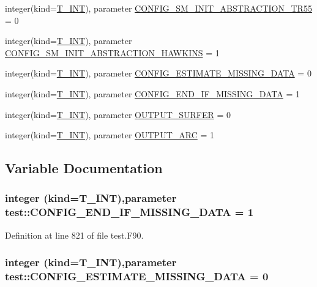 \begin{DoxyCompactItemize}
\item 
integer(kind=\hyperlink{namespacetest_a6f91ebd89b58cfcc5da99faed9385c1e}{T\_\-INT}), parameter \hyperlink{namespacetest_a8021cee63a2d97e255d88e15f412eb56}{CONFIG\_\-SM\_\-INIT\_\-ABSTRACTION\_\-TR55} = 0
\item 
integer(kind=\hyperlink{namespacetest_a6f91ebd89b58cfcc5da99faed9385c1e}{T\_\-INT}), parameter \hyperlink{namespacetest_ad42c9ade45d8d8085a2fd417fe22878a}{CONFIG\_\-SM\_\-INIT\_\-ABSTRACTION\_\-HAWKINS} = 1
\item 
integer(kind=\hyperlink{namespacetest_a6f91ebd89b58cfcc5da99faed9385c1e}{T\_\-INT}), parameter \hyperlink{namespacetest_a9cfe4d8cc45e7a6425b6484a7907ffbd}{CONFIG\_\-ESTIMATE\_\-MISSING\_\-DATA} = 0
\item 
integer(kind=\hyperlink{namespacetest_a6f91ebd89b58cfcc5da99faed9385c1e}{T\_\-INT}), parameter \hyperlink{namespacetest_a06fa73fa08fb7cb44b868aead4d77a73}{CONFIG\_\-END\_\-IF\_\-MISSING\_\-DATA} = 1
\item 
integer(kind=\hyperlink{namespacetest_a6f91ebd89b58cfcc5da99faed9385c1e}{T\_\-INT}), parameter \hyperlink{namespacetest_a19efe476537676b4902cb464d566af6f}{OUTPUT\_\-SURFER} = 0
\item 
integer(kind=\hyperlink{namespacetest_a6f91ebd89b58cfcc5da99faed9385c1e}{T\_\-INT}), parameter \hyperlink{namespacetest_ada8330c2643deca7d4e85ce248e3e941}{OUTPUT\_\-ARC} = 1
\end{DoxyCompactItemize}


\subsection{Variable Documentation}
\hypertarget{namespacetest_a06fa73fa08fb7cb44b868aead4d77a73}{
\subsubsection[{CONFIG\_\-END\_\-IF\_\-MISSING\_\-DATA}]{\setlength{\rightskip}{0pt plus 5cm}integer (kind={\bf T\_\-INT}),parameter {\bf test::CONFIG\_\-END\_\-IF\_\-MISSING\_\-DATA} = 1}}
\label{namespacetest_a06fa73fa08fb7cb44b868aead4d77a73}


Definition at line 821 of file test.F90.

\hypertarget{namespacetest_a9cfe4d8cc45e7a6425b6484a7907ffbd}{
\subsubsection[{CONFIG\_\-ESTIMATE\_\-MISSING\_\-DATA}]{\setlength{\rightskip}{0pt plus 5cm}integer (kind={\bf T\_\-INT}),parameter {\bf test::CONFIG\_\-ESTIMATE\_\-MISSING\_\-DATA} = 0}}
\label{namespacetest_a9cfe4d8cc45e7a6425b6484a7907ffbd}


